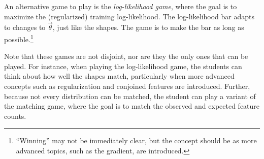 \documentclass[11pt,letterpaper]{article}
\newcommand{\Note}[1]{}
\renewcommand{\Note}[1]{\hl{[#1]}}  %
\newcommand{\NoteSigned}[3]{{\sethlcolor{#2}\Note{#1: #3}}}
\newcommand{\NoteFF}[1]{\NoteSigned{FF}{LightBlue}{#1}}
\begin{document}
An alternative game to play is the \textit{log-likelihood game}, where the goal is to
maximize the (regularized) training log-likelihood. The log-likelihood bar adapts to 
changes to $\vec{\theta}$, just like the shapes. The game is to make the bar as 
long as possible.\footnote{``Winning'' may not be immediately clear, but the concept should be 
as more advanced topics, such as the gradient, are introduced.}

Note that these games are not disjoint, nor are they the only ones that can be played.
For instance, when playing the log-likelihood game, the students can think about how well 
the shapes match, particularly when more advanced concepts such as regularization and 
conjoined features are introduced. Further, because not every distribution can be matched, 
the student can play a variant of the matching game, where the goal
is to match the observed and expected feature counts. 


\end{document}
